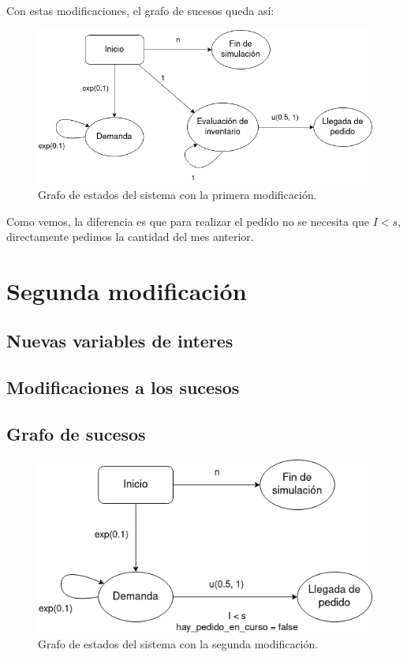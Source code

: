 \documentclass[12pt, spanish]{article}
\begin{document}
Con estas modificaciones, el grafo de sucesos queda así:

\begin{figure}[H]
  \centering
   \includegraphics[width=\textwidth]{grafo_sucesos_mod1.png}
	\caption{Grafo de estados del sistema con la primera modificación.}
\end{figure}

Como vemos, la diferencia es que para realizar el pedído no se necesita que $I < s$, directamente pedimos la cantidad del mes anterior.

\section{Segunda modificación}

\subsection{Nuevas variables de interes}

\subsection{Modificaciones a los sucesos}

\subsection{Grafo de sucesos}

\begin{figure}[H]
  \centering
   \includegraphics[width=\textwidth]{grafo_sucesos_mod2.png}
	\caption{Grafo de estados del sistema con la segunda modificación.}
\end{figure}
\end{document}

